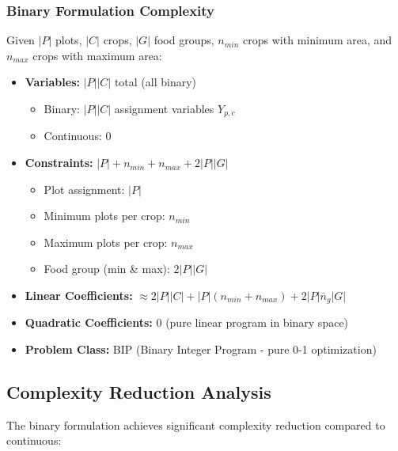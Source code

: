 \documentclass{article}
\begin{document}
\subsubsection{Binary Formulation Complexity}

Given $|P|$ plots, $|C|$ crops, $|G|$ food groups, $n_{min}$ crops with minimum area, and $n_{max}$ crops with maximum area:

\begin{itemize}
    \item \textbf{Variables:} $|P||C|$ total (all binary)
    \begin{itemize}
        \item Binary: $|P||C|$ assignment variables $Y_{p,c}$
        \item Continuous: 0
    \end{itemize}
    
    \item \textbf{Constraints:} $|P| + n_{min} + n_{max} + 2|P||G|$
    \begin{itemize}
        \item Plot assignment: $|P|$
        \item Minimum plots per crop: $n_{min}$
        \item Maximum plots per crop: $n_{max}$
        \item Food group (min \& max): $2|P||G|$
    \end{itemize}
    
    \item \textbf{Linear Coefficients:} $\approx 2|P||C| + |P|(n_{min} + n_{max}) + 2|P|\bar{n}_g|G|$
    
    \item \textbf{Quadratic Coefficients:} 0 (pure linear program in binary space)
    
    \item \textbf{Problem Class:} BIP (Binary Integer Program - pure 0-1 optimization)
\end{itemize}

\subsection{Complexity Reduction Analysis}

The binary formulation achieves significant complexity reduction compared to continuous:
\end{document}
